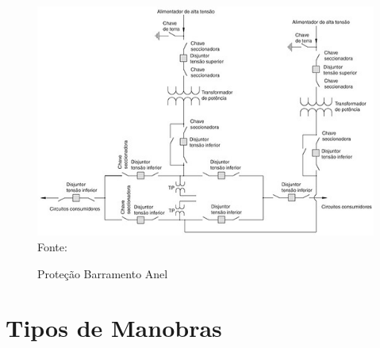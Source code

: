 \begin{figure}[H] 
    \centering
    \caption{Proteção Barramento Anel}
    \includegraphics[scale = 1]{figuras/BarraAnel.png}
    \\ Fonte: \cite{mamede2000protecao}
    \label{fig:BarraAnel}
\end{figure}


\section{Tipos de Manobras}
